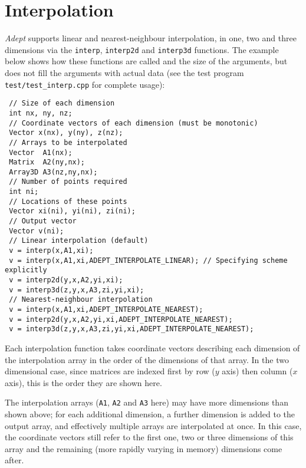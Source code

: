 \documentclass[a4,oneside]{book}
\def\codesize{\small}
\def\code#1{{\codesize\texttt{#1}}}
\begin{document}
\section{Interpolation}
\emph{Adept} supports linear and nearest-neighbour interpolation, in
one, two and three dimensions via the \code{interp}, \code{interp2d}
and \code{interp3d} functions. The example below shows how these
functions are called and the size of the arguments, but does not fill
the arguments with actual data (see the test program
\code{test/test\_interp.cpp} for complete usage):
%
\begin{lstlisting}
 // Size of each dimension
 int nx, ny, nz;
 // Coordinate vectors of each dimension (must be monotonic)
 Vector x(nx), y(ny), z(nz);
 // Arrays to be interpolated
 Vector  A1(nx);
 Matrix  A2(ny,nx);
 Array3D A3(nz,ny,nx);
 // Number of points required
 int ni;
 // Locations of these points
 Vector xi(ni), yi(ni), zi(ni);
 // Output vector
 Vector v(ni);
 // Linear interpolation (default)
 v = interp(x,A1,xi);
 v = interp(x,A1,xi,ADEPT_INTERPOLATE_LINEAR); // Specifying scheme explicitly
 v = interp2d(y,x,A2,yi,xi);
 v = interp3d(z,y,x,A3,zi,yi,xi);
 // Nearest-neighbour interpolation
 v = interp(x,A1,xi,ADEPT_INTERPOLATE_NEAREST);
 v = interp2d(y,x,A2,yi,xi,ADEPT_INTERPOLATE_NEAREST);
 v = interp3d(z,y,x,A3,zi,yi,xi,ADEPT_INTERPOLATE_NEAREST);
\end{lstlisting}
%
Each interpolation function takes coordinate vectors describing each
dimension of the interpolation array in the order of the dimensions of
that array. In the two dimensional case, since matrices are indexed
first by row ($y$ axis) then column ($x$ axis), this is the order they
are shown here.

The interpolation arrays (\code{A1}, \code{A2} and \code{A3} here) may
have more dimensions than shown above; for each additional dimension, a
further dimension is added to the output array, and effectively
multiple arrays are interpolated at once. In this case, the coordinate
vectors still refer to the first one, two or three dimensions of this
array and the remaining (more rapidly varying in memory) dimensions
come after.
\end{document}
